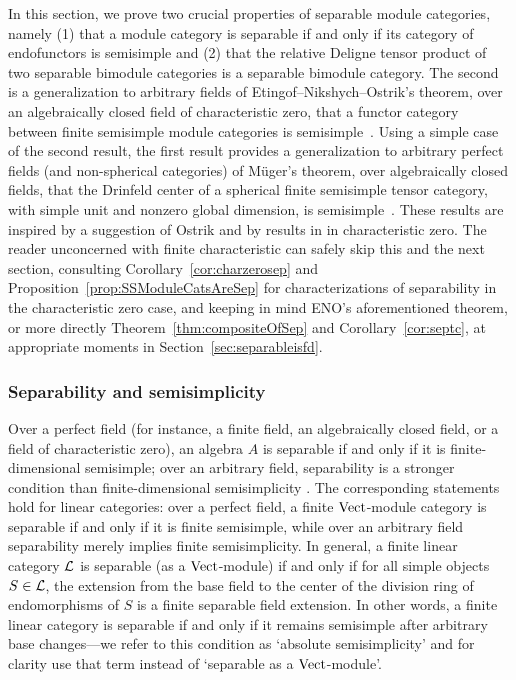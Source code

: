 \documentclass{amsart}
\begin{document}
In this section, we prove two crucial properties of separable module categories, namely (1) that a module category is separable if and only if its category of endofunctors is semisimple and (2) that the relative Deligne tensor product of two separable bimodule categories is a separable bimodule category.  The second is a generalization to arbitrary fields of Etingof--Nikshych--Ostrik's theorem, over an algebraically closed field of characteristic zero, that a functor category between finite semisimple module categories is semisimple~\cite[Theorem 2.16]{MR2183279}.  Using a simple case of the second result, the first result provides a generalization to arbitrary perfect fields (and non-spherical categories) of M\"uger's theorem, over algebraically closed fields, that the Drinfeld center of a spherical finite semisimple tensor category, with simple unit and nonzero global dimension, is semisimple~\cite[Theorem 3.16]{MR1966525}.    These results are inspired by a suggestion of Ostrik and by results in \cite[\S 2.4]{MR3039775} in characteristic zero.  The reader unconcerned with finite characteristic can safely skip this and the next section, consulting Corollary~\ref{cor:charzerosep} and Proposition~\ref{prop:SSModuleCatsAreSep} for characterizations of separability in the characteristic zero case, and keeping in mind ENO's aforementioned theorem, or more directly Theorem~\ref{thm:compositeOfSep} and Corollary~\ref{cor:septc}, at appropriate moments in Section~\ref{sec:separableisfd}.  

\subsubsection{Separability and semisimplicity} \label{sec:sepandsemi}

Over a perfect field (for instance, a finite field, an algebraically closed field, or a field of characteristic zero), an algebra $A$ is separable if and only if it is finite-dimensional semisimple; over an arbitrary field, separability is a stronger condition than finite-dimensional semisimplicity \cite[Ch.~2]{MR0280479}.  The corresponding statements hold for linear categories: over a perfect field, a finite $\mathrm{Vect}$-module category is separable if and only if it is finite semisimple, while over an arbitrary field separability merely implies finite semisimplicity. %
In general, a finite linear category $\mathcal L$ is separable (as a $\mathrm{Vect}$-module) if and only if for all simple objects $S \in \mathcal L$, the extension from the base field to the center of the division ring of endomorphisms of $S$ is a finite separable field extension.  In other words, a finite linear category is separable if and only if it remains semisimple after arbitrary base changes---we refer to this condition as `absolute semisimplicity' and for clarity use that term instead of `separable as a $\mathrm{Vect}$-module'.  %
\end{document}
